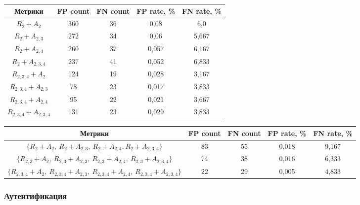 \begin{multicols}{2}
\begin{table*}[b]
\begin{center}
  \begin{tabular}{|c|c|c|c|c|}
                    \hline
                    Метрики& FP count& FN count & FP rate, \% & FN rate, \%\\
                    \hline
$R_2 + A_2$ & 360& 36& 0,08\hphantom{9}& 6,0\hphantom{99}\\
$R_2 + A_{2,3}$ & 272& 34& 0,06\hphantom{9}& 5,667\\
 $R_2 + A_{2,4}$ &  260& 37& 0,057& 6,167\\
 $R_2 + A_{2,3,4}$ & 237& 41& 0,052& 6,833\\
$R_{2,3,4} + A_2$ & 124& 19& 0,028& 3,167\\
$R_{2,3,4} + A_{2,3}$ & \hphantom{9}78 & 23& 0,017& 3,833\\ 
$R_{2,3,4} + A_{2,4}$ &  \hphantom{9}95& 22 & 0,021& 3,667\\ 
$R_{2,3,4} + A_{2,3,4}$ & 131& 23& 0,029& 3,833\\
        \hline
    \end{tabular}
    \end{center}

\begin{center}
    \label{res_seq}
    \vspace*{2ex}
    
    \begin{tabular}{|c|c|c|c|c|}
                    \hline
                    Метрики& FP count& FN count & FP rate, \% & FN rate, \%\\
                    \hline
$\{R_2 + A_2,\ R_2+A_{2,3}, \ R_2+A_{2,4}.\ R_2+A_{2,3,4}\}$ & 83 & 55 & 0,018& 9,167\\
$\{R_{2,3} + A_2,\ R_{2,3}+A_{2,3},\ R_{2,3}+A_{2,4},\ R_{2,3}+A_{2,3,4}\}$ &
74& 38& 0,016& 6,333\\
 $\{R_{2,3,4} + A_2,\ R_{2,3,4} + A_{2,3},\ R_{2,3,4} + A_{2,4},\
R_{2,3,4} + A_{2,3,4}\}$ & 22& 29& 0,005& 4,833\\
        \hline
    \end{tabular}
    \end{center}
\end{table*}

\subsubsection{Аутентификация}


\end{multicols}
